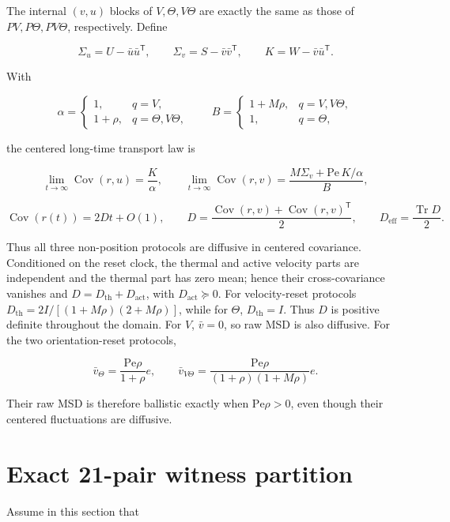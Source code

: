 The internal \((v,u)\) blocks of \(V,\Theta,V\Theta\) are exactly the same as those of \(PV,P\Theta,PV\Theta\), respectively. Define

\[
\Sigma_u=U-\bar u\bar u^\mathsf T,\qquad
\Sigma_v=S-\bar v\bar v^\mathsf T,\qquad
K=W-\bar v\bar u^\mathsf T.
\]

With

\[
\alpha=
\begin{cases}
1,&q=V,\\
1+\rho,&q=\Theta,V\Theta,
\end{cases}
\qquad
B=
\begin{cases}
1+M\rho,&q=V,V\Theta,\\
1,&q=\Theta,
\end{cases}
\]

the centered long-time transport law is

\[
\lim_{t\to\infty}\operatorname{Cov}(r,u)=\frac{K}{\alpha},
\qquad
\lim_{t\to\infty}\operatorname{Cov}(r,v)
=\frac{M\Sigma_v+\mathrm{Pe}\,K/\alpha}{B},
\]

\[
\operatorname{Cov}(r(t))=2Dt+O(1),\qquad
D=\frac{\operatorname{Cov}(r,v)+
        \operatorname{Cov}(r,v)^\mathsf T}{2},
\qquad
D_{\mathrm{eff}}=\frac{\operatorname{Tr}D}{2}.
\]

Thus all three non-position protocols are diffusive in centered covariance. Conditioned on the reset clock, the thermal and active velocity parts are independent and the thermal part has zero mean; hence their cross-covariance vanishes and \(D=D_{\mathrm{th}}+D_{\mathrm{act}}\), with \(D_{\mathrm{act}}\succeq0\). For velocity-reset protocols \(D_{\mathrm{th}}=2I/[(1+M\rho)(2+M\rho)]\), while for \(\Theta\), \(D_{\mathrm{th}}=I\). Thus \(D\) is positive definite throughout the domain. For \(V\), \(\bar v=0\), so raw MSD is also diffusive. For the two orientation-reset protocols,

\[
\bar v_\Theta=\frac{\mathrm{Pe}\rho}{1+\rho}e,\qquad
\bar v_{V\Theta}
=\frac{\mathrm{Pe}\rho}{(1+\rho)(1+M\rho)}e.
\]

Their raw MSD is therefore ballistic exactly when \(\mathrm{Pe}\rho>0\), even though their centered fluctuations are diffusive.



\section{Exact 21-pair witness partition}\label{s4.-exact-21-pair-witness-table}

Assume in this section that

